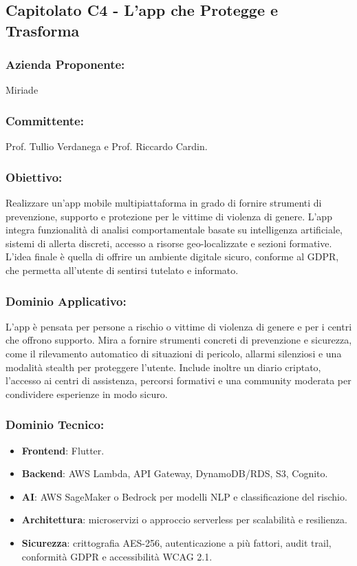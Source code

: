 \documentclass[a4paper,12pt]{article}
\begin{document}
\subsection{Capitolato C4 - L’app che Protegge e Trasforma}
\subsubsection*{Azienda Proponente:} Miriade
\subsubsection*{Committente:} Prof. Tullio Verdanega e Prof. Riccardo Cardin.
\subsubsection*{Obiettivo:}
Realizzare un’app mobile multipiattaforma in grado di fornire strumenti di prevenzione, supporto e protezione per le vittime di violenza di genere.  
L’app integra funzionalità di analisi comportamentale basate su intelligenza artificiale, sistemi di allerta discreti, accesso a risorse geo-localizzate e sezioni formative.  
L’idea finale è quella di offrire un ambiente digitale sicuro, conforme al GDPR, che permetta all’utente di sentirsi tutelato e informato.

\subsubsection*{Dominio Applicativo:}
L’app è pensata per persone a rischio o vittime di violenza di genere e per i centri che offrono supporto.  
Mira a fornire strumenti concreti di prevenzione e sicurezza, come il rilevamento automatico di situazioni di pericolo, allarmi silenziosi e una modalità stealth per proteggere l’utente.  
Include inoltre un diario criptato, l’accesso ai centri di assistenza, percorsi formativi e una community moderata per condividere esperienze in modo sicuro.


\subsubsection*{Dominio Tecnico:}
\begin{itemize}[leftmargin=*]
    \item \textbf{Frontend}: Flutter.
    \item \textbf{Backend}: AWS Lambda, API Gateway, DynamoDB/RDS, S3, Cognito.
    \item \textbf{AI}: AWS SageMaker o Bedrock per modelli NLP e classificazione del rischio.
    \item \textbf{Architettura}: microservizi o approccio serverless per scalabilità e resilienza.
    \item \textbf{Sicurezza}: crittografia AES-256, autenticazione a più fattori, audit trail, conformità GDPR e accessibilità WCAG 2.1.
\end{itemize}
\end{document}

